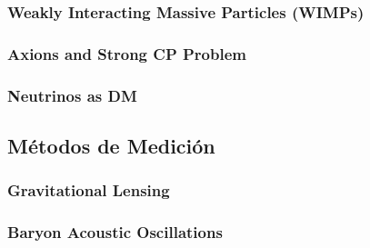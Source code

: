 \documentclass[12pt]{article}
\begin{document}
\subsubsection{Weakly Interacting Massive Particles (WIMPs)}
\subsubsection{Axions and Strong CP Problem}
\subsubsection{Neutrinos as DM}

\subsection{Métodos de Medición}
\subsubsection{Gravitational Lensing}
\subsubsection{Baryon Acoustic Oscillations}

\printbibliography
\end{document}
